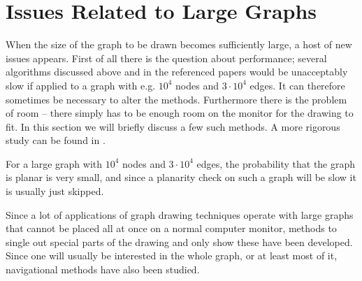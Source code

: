 \section{Issues Related to Large Graphs}

When the size of the graph to be drawn becomes sufficiently large, a host of
new issues appears. First of all there is the question about performance;
several algorithms discussed above and in the referenced papers would be
unacceptably slow if applied to a graph with e.g. $10^4$ nodes and
$3\cdot10^4$ edges. It can therefore sometimes be necessary to alter the
methods. Furthermore there is the problem of room -- there simply has to be
enough room on the monitor for the drawing to fit. In this section we will
briefly discuss a few such methods. A more rigorous study can be found in
\cite{Herman2000}.

For a large graph with $10^4$ nodes and $3\cdot10^4$ edges, the probability
that the graph is planar is very small, and since a planarity check on such a
graph will be slow it is usually just skipped. 


Since a lot of applications of graph drawing techniques operate with large
graphs that cannot be placed all at once on a normal computer monitor, methods
to single out special parts of the drawing and only show these have been
developed. Since one will usually be interested in the whole graph, or at
least most of it, navigational methods have also been studied. 

